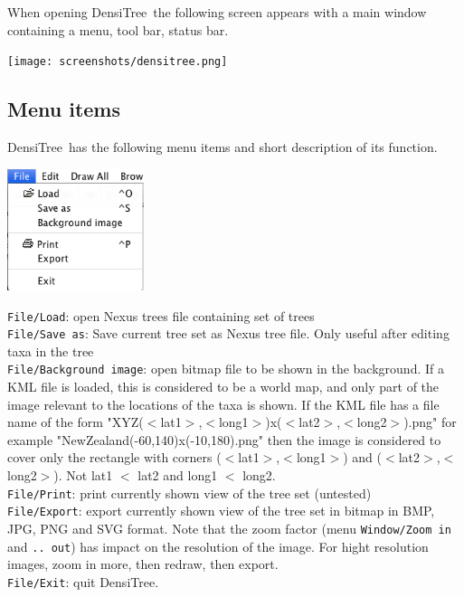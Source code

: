 \documentclass{article}
\def\DensiTree{DensiTree}
\begin{document}
When opening \DensiTree\ the following screen appears with a main window containing
a menu, tool bar, status bar.
\begin{center}
\texttt{[image: screenshots/densitree.png]}
\end{center}


\subsection{Menu items}
\DensiTree\ has the following menu items and short description of its function.

\begin{center}
\includegraphics[width=4cm]{menufile.png}
\end{center}

\noindent
{\tt File/Load}: open Nexus trees file containing set of trees\\
{\tt File/Save as}: Save current tree set as Nexus tree file. Only useful after editing taxa in the tree\\
{\tt File/Background image}: open bitmap file to be shown in the background. If a KML file is
loaded, this is considered to be a world map, and only part of the image relevant to the locations
of the taxa is shown. If the KML file has a file name of the form "XYZ($<$lat1$>$,$<$long1$>$)x($<$lat2$>$,$<$long2$>$).png"
for example "NewZealand(-60,140)x(-10,180).png"
then the image is considered to cover only the rectangle with corners  ($<$lat1$>$,$<$long1$>$) and 
($<$lat2$>$,$<$long2$>$). Not lat1 $<$ lat2 and long1 $<$ long2.\\
{\tt File/Print}: print currently shown view of the tree set (untested)\\
{\tt File/Export}: export currently shown view of the tree set in bitmap in BMP, JPG, PNG and SVG
format.
Note that the zoom factor (menu {\tt Window/Zoom in} and {\tt .. out}) has impact on the resolution 
of the image. For hight resolution images, zoom in more, then redraw, then export.\\
{\tt File/Exit}: quit \DensiTree.
\end{document}
